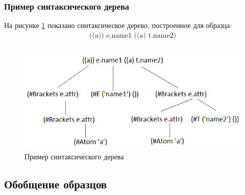 \documentclass[12pt]{article}
\begin{document}
\subsubsection[Пример синтаксического дерева]{\large Пример синтаксического дерева}
\hspace{\parindent} На рисунке \ref{fig:tree} показано синтаксическое дерево, построенное для образца:
\begin{equation*}
\begin{array}{l}
\textrm{((a)) e.name1 ((a) t.name2)} \\
\end{array}
\end{equation*}

\begin{figure}
\centering
\includegraphics[width=0.7\linewidth]{./chapter3/tree}
\caption{Пример синтаксического дерева}
\label{fig:tree}
\end{figure}


\subsection[Обобщение образцов]{\large Обобщение образцов}
\end{document}
